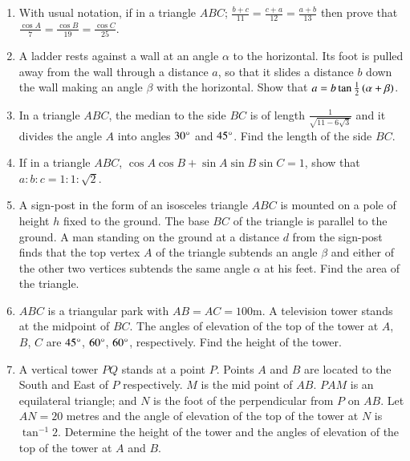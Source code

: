 \documentclass[journal]{IEEEtran}
\begin{document}
\begin{enumerate}
\hfill{}

\item With usual notation, if in a triangle $ABC$; $\frac{b+c}{11}=\frac{c+a}{12}=\frac{a+b}{13}$ then prove that $\frac{\cos{A}}{7}=\frac{\cos{B}}{19}=\frac{\cos{C}}{25}$. 

\hfill{}

\item A ladder rests against a wall at an angle $\alpha$ to the horizontal. Its foot is pulled away from the wall through a distance $a$, so that it slides a distance $b$ down the wall making an angle $\beta$ with the horizontal. Show that $a=b\tan{\frac{1}{2}\ensuremath{\left(\alpha+\beta\right)}}$.

\hfill{}

\item In a triangle $ABC$, the median to the side $BC$ is of length $\frac{1}{\sqrt{11-6\sqrt{3}}}$ and it divides the angle $A$ into angles $30\degree$ and $45\degree$. Find the length of the side $BC$.

\hfill{}

\item If in a triangle $ABC$, $\cos{A}\cos{B}+\sin{A}\sin{B}\sin{C}=1$, show that $a:b:c=1:1:\sqrt{2}$.

\hfill{}

\item A sign-post in the form of an isosceles triangle $ABC$ is mounted on a pole of height $h$ fixed to the ground. The base $BC$ of the triangle is parallel to the ground. A man standing on the ground at a distance $d$ from the sign-post finds that the top vertex $A$ of the triangle subtends an angle $\beta$ and either of the other two vertices subtends the same angle $\alpha$ at his feet. Find the area of the triangle. 

\hfill{}

\item $ABC$ is a triangular park with $AB=AC=100$m. A television tower stands at the midpoint of $BC$. The angles of elevation of the top of the tower at $A$, $B$, $C$ are $45\degree$, $60\degree$, $60\degree$, respectively. Find the height of the tower. 

\hfill{}

\item A vertical tower $PQ$ stands at a point $P$. Points $A$ and $B$ are located to the South and East of $P$ respectively. $M$ is the mid point of $AB$. $PAM$ is an equilateral triangle; and $N$ is the foot of the perpendicular from $P$ on $AB$. Let $AN=20$ metres and the angle of elevation of the top of the tower at $N$ is $\tan^{-1}{2}$. Determine the height of the tower and the angles of elevation of the top of the tower at $A$ and $B$.


\end{enumerate}
\end{document}

